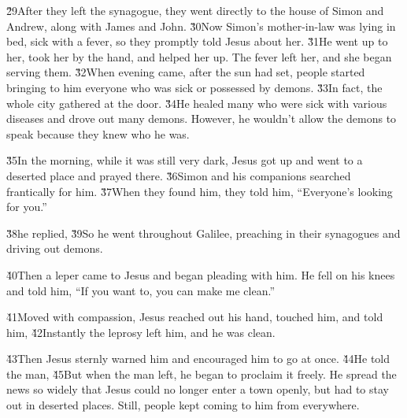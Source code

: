 \v{29}After they left the synagogue, they went directly to the house of Simon and Andrew, along with James and John. \v{30}Now Simon's mother-in-law was lying in bed, sick with a fever, so they promptly told Jesus about her. \v{31}He went up to her, took her by the hand, and helped her up. The fever left her, and she began serving them. \v{32}When evening came, after the sun had set, people started bringing to him everyone who was sick or possessed by demons. \v{33}In fact, the whole city gathered at the door. \v{34}He healed many who were sick with various diseases and drove out many demons. However, he wouldn't allow the demons to speak because they knew who he was.

\v{35}In the morning, while it was still very dark, Jesus got up and went to a deserted place and prayed there. \v{36}Simon and his companions searched frantically for him. \v{37}When they found him, they told him, ``Everyone's looking for you.''

\v{38}he replied,  \v{39}So he went throughout Galilee, preaching in their synagogues and driving out demons.

\v{40}Then a leper came to Jesus and began pleading with him. He fell on his knees and told him, ``If you want to, you can make me clean.''

\v{41}Moved with compassion, Jesus reached out his hand, touched him, and told him,  \v{42}Instantly the leprosy left him, and he was clean.

\v{43}Then Jesus sternly warned him and encouraged him to go at once. \v{44}He told the man,  \v{45}But when the man left, he began to proclaim it freely. He spread the news so widely that Jesus could no longer enter a town openly, but had to stay out in deserted places. Still, people kept coming to him from everywhere.

